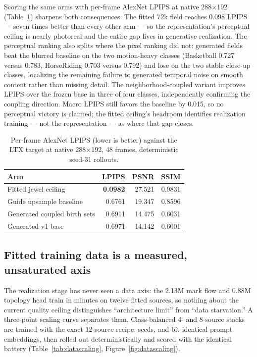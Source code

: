 \documentclass[10pt]{article}
\begin{document}
Scoring the same arms with per-frame AlexNet LPIPS at native 288\(\times\)192
(Table~\ref{tab:lpips}) sharpens both consequences. The fitted 72k field reaches 0.098 LPIPS ---
seven times better than every other arm --- so the representation's perceptual ceiling is nearly
photoreal and the entire gap lives in generative realization. The perceptual ranking also splits
where the pixel ranking did not: generated fields beat the blurred baseline on the two
motion-heavy classes (Basketball 0.727 versus 0.783, HorseRiding 0.703 versus 0.792) and lose on
the two stable close-up classes, localizing the remaining failure to generated temporal noise on
smooth content rather than missing detail. The neighborhood-coupled variant improves LPIPS over
the frozen base in three of four classes, independently confirming the coupling direction. Macro
LPIPS still favors the baseline by 0.015, so no perceptual victory is claimed; the fitted
ceiling's headroom identifies realization training --- not the representation --- as where that
gap closes.

\begin{table}[H]
\centering
\small
\caption{Per-frame AlexNet LPIPS (lower is better) against the LTX target at native
288\(\times\)192, 48 frames, deterministic seed-31 rollouts.}
\label{tab:lpips}
\begin{tabular}{@{}lrrr@{}}
\toprule
Arm & LPIPS & PSNR & SSIM \\
\midrule
Fitted jewel ceiling & \textbf{0.0982} & 27.521 & 0.9831 \\
Guide upsample baseline & 0.6761 & 19.347 & 0.8596 \\
Generated coupled birth sets & 0.6911 & 14.475 & 0.6031 \\
Generated v1 base & 0.6971 & 14.142 & 0.6001 \\
\bottomrule
\end{tabular}
\end{table}

\subsection{Fitted training data is a measured, unsaturated axis}

The realization stage has never seen a data axis: the 2.13M mark flow and 0.88M topology head
train in minutes on twelve fitted sources, so nothing about the current quality ceiling
distinguishes ``architecture limit'' from ``data starvation.'' A three-point scaling curve
separates them. Class-balanced 4- and 8-source stacks are trained with the exact 12-source
recipe, seeds, and bit-identical prompt embeddings, then rolled out deterministically and scored
with the identical battery (Table~\ref{tab:datascaling}, Figure~\ref{fig:datascaling}).
\end{document}
